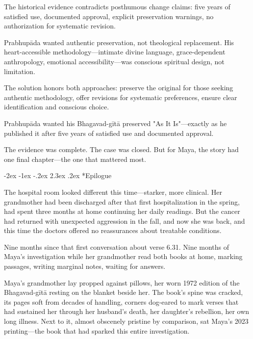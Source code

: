 \documentclass[12pt,twoside]{book}
\makeatletter
\renewcommand\section{\@startsection{section}{1}{\z@}%
{-2ex \@plus -1ex \@minus -.2ex}%
{2.3ex \@plus.2ex}%
{\normalfont\Large\bfseries}}
\makeatother
\begin{document}
The historical evidence contradicts posthumous change claims: five years of satisfied use, documented approval, explicit preservation warnings, no authorization for systematic revision.

Prabhupāda wanted authentic preservation, not theological replacement. His heart-accessible methodology—intimate divine language, grace-dependent anthropology, emotional accessibility—was conscious spiritual design, not limitation.

The solution honors both approaches: preserve the original for those seeking authentic methodology, offer revisions for systematic preferences, ensure clear identification and conscious choice.

Prabhupāda wanted his Bhagavad-gītā preserved "As It Is"—exactly as he published it after five years of satisfied use and documented approval.

The evidence was complete. The case was closed. But for Maya, the story had one final chapter—the one that mattered most.

\clearpage
{}
\section*{Epilogue}
\thispagestyle{chapterpage}

\normalfont\justifying

The hospital room looked different this time—starker, more clinical. Her grandmother had been discharged after that first hospitalization in the spring, had spent three months at home continuing her daily readings. But the cancer had returned with unexpected aggression in the fall, and now she was back, and this time the doctors offered no reassurances about treatable conditions.

Nine months since that first conversation about verse 6.31. Nine months of Maya's investigation while her grandmother read both books at home, marking passages, writing marginal notes, waiting for answers.

Maya's grandmother lay propped against pillows, her worn 1972 edition of the Bhagavad-gītā resting on the blanket beside her. The book's spine was cracked, its pages soft from decades of handling, corners dog-eared to mark verses that had sustained her through her husband's death, her daughter's rebellion, her own long illness. Next to it, almost obscenely pristine by comparison, sat Maya's 2023 printing—the book that had sparked this entire investigation.
\end{document}
